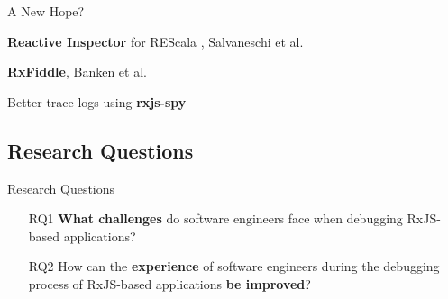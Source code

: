 \documentclass[aspectratio=169]{beamer}
\begin{document}
\begin{frame}[fragile]{A New Hope?}
    \begin{vfilleditems}
        \item \textbf{Reactive Inspector} for REScala \cite{10.1145/2577080.2577083}, Salvaneschi et al. \cite{10.1145/2884781.2884815} \cite{10.1145/2889160.2893174}
        \item \textbf{RxFiddle}, Banken et al. \cite{10.1145/3180155.3180156}
        \item Better trace logs using \textbf{rxjs-spy} \cite{rxjsspy}
    \end{vfilleditems}
\end{frame}



\subsection{Research Questions}

\begin{frame}[fragile]{Research Questions}
    \begin{enumerate}
        \vfill\item[RQ1] \textbf{What challenges} do software engineers face when debugging RxJS-based applications?
        \vfill\item[RQ2] How can the \textbf{experience} of software engineers during the debugging process of RxJS-based applications \textbf{be improved}?
    \end{enumerate}
\end{frame}

\end{document}

